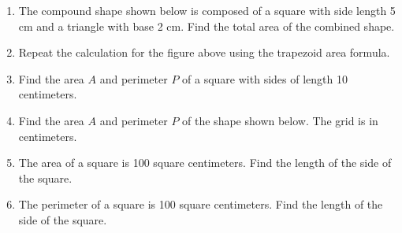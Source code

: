 \begin{enumerate}
\item The compound shape shown below is composed of a square with side length 5 cm and a triangle with base 2 cm. Find the total area of the combined shape.
    \vspace{1cm} 
    \begin{flushleft}
    \end{flushleft} \vspace{1cm}
\item Repeat the calculation for the figure above using the trapezoid area formula.

\item Find the area $A$ and perimeter $P$ of a square with sides of length 10 centimeters. \vspace{4cm}
    
  \item Find the area $A$ and perimeter $P$ of the shape shown below. The grid is in centimeters.
      \begin{flushleft}
      \end{flushleft}
        
  \item The area of a square is 100 square centimeters. Find the length of the side of the square. \vspace{3cm}
      
  \item The perimeter of a square is 100 square centimeters. Find the length of the side of the square.
  

\end{enumerate}
